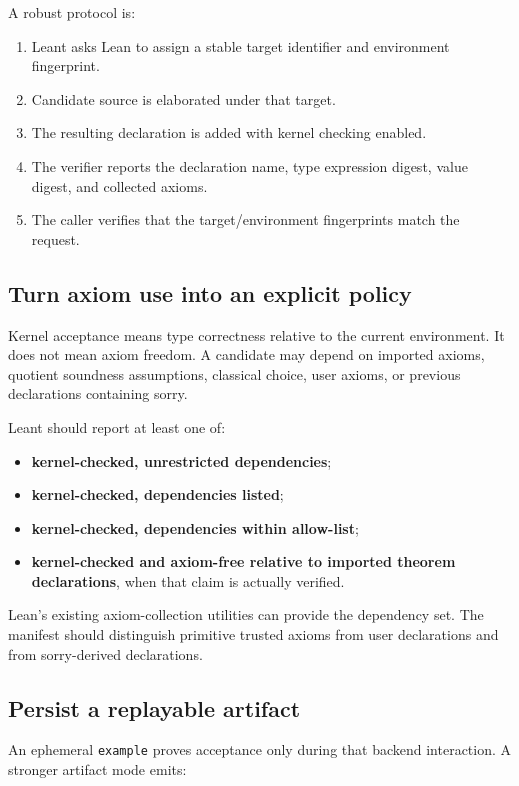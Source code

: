 \documentclass[11pt,letterpaper,openany]{report}
\theoremstyle{definition}
\theoremstyle{remark}
\newcommand{\code}[1]{\texttt{#1}}
\begin{document}
A robust protocol is:

\begin{enumerate}
\item Leant asks Lean to assign a stable target identifier and environment fingerprint.
\item Candidate source is elaborated under that target.
\item The resulting declaration is added with kernel checking enabled.
\item The verifier reports the declaration name, type expression digest, value digest, and collected axioms.
\item The caller verifies that the target/environment fingerprints match the request.
\end{enumerate}

\subsection{Turn axiom use into an explicit policy}

Kernel acceptance means type correctness relative to the current environment. It does not mean axiom freedom. A candidate may depend on imported axioms, quotient soundness assumptions, classical choice, user axioms, or previous declarations containing sorry.

Leant should report at least one of:

\begin{itemize}
\item \textbf{kernel-checked, unrestricted dependencies};
\item \textbf{kernel-checked, dependencies listed};
\item \textbf{kernel-checked, dependencies within allow-list};
\item \textbf{kernel-checked and axiom-free relative to imported theorem declarations}, when that claim is actually verified.
\end{itemize}

Lean's existing axiom-collection utilities can provide the dependency set. The manifest should distinguish primitive trusted axioms from user declarations and from sorry-derived declarations.

\subsection{Persist a replayable artifact}

An ephemeral \code{example} proves acceptance only during that backend interaction. A stronger artifact mode emits:
\end{document}
